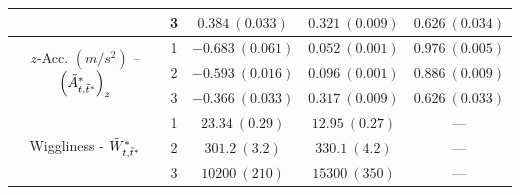 \begin{table}[ht]
{\begin{tabular}{ccccc}
                                                                                   & 3                                    & $0.384 \ (0.033)$  & $0.321\ (0.009)$ & $0.626\ (0.034)$ \\ \hline
    \multirow{3}{*}{$z$-Acc. $(m/s^2)$ -- $\left(\tilde{A}^*_{t,\tilde t^*}\right)_z$}   & 1                                    & $-0.683\ (0.061)$  & $0.052\ (0.001)$ & $0.976\ (0.005)$ \\
                                                                                   & 2                                    & $-0.593\ (0.016)$  & $0.096\ (0.001)$ & $0.886\ (0.009)$ \\
                                                                                   & 3                                    & $-0.366\ (0.033)$  & $0.317\ (0.009)$ & $0.626\ (0.033)$ \\ \hline
    \multirow{3}{*}{Wiggliness - $\tilde{W}^*_{t,\tilde t^*}$}                           & 1                                    & $23.34 \ (0.29)$   & $12.95\ (0.27)$  & ---               \\
                                                                                   & 2                                    & $301.2 \ (3.2)$    & $330.1\ (4.2)$   & ---               \\
                                                                                   & 3                                    & $10200 \ (210)$    & $15300\ (350)$   & ---               \\ \hline
    \end{tabular}
    }
    \label{table:emis_dists_CarHHMM-DFT}
\end{table}

